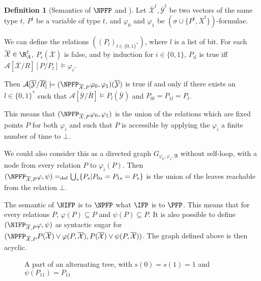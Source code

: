 \documentclass[a4paper,12pt]{article}
\theoremstyle{definition}
\newtheorem{definition}[theorem]{Definition}
\renewcommand{\phi}{\varphi}
\newcommand{\mc}{\mathcal}
\newcommand{\mf}{\mathfrak}
\newcommand{\ol}{\overline}
\newcommand{\olmc}[1]{\overline{\mathcal{#1}}}
\newcommand{\ed}{=_{\mathrm{def}}}
\begin{document}
\begin{definition}[Semantics of $\NPFP$ and \NIFP]\label{dnpfp}
  Let $\olmc {X}^{t},\olmc{Y}^{t}$ be two vectors of the same type $t$,
  $P^{t}$ be a variable of type $t$, and $\phi_{0}$  and $\phi_{1}$ be
  $(\sigma\cup\{P^{t},\ol X^{t}\})$-formulae.

  We can define the relations $((P_{l})_{l\in\{0,1\}^{*}})$, where $l$ is
  a list of bit. For each $\olmc X\in\R^{t}_{A}$, $P_{\epsilon}(\olmc
  X)$ is false, and by induction for $i\in \{0,1\}$, $P_{il}$ is true
  iff $\mc A[\olmc X/R][P/P_{t}]\models\phi_{i}$.
  

  Then $\mc A[\olmc Y/\ol R]\models(\NPFP_{\olmc X,P}\phi_{0},\phi_{1})(\olmc
  Y)$ is true if and only if there exists an $l\in\{0,1\}^{*}$ such that $\mc
  A[\olmc Y/\ol R]\models P_{l}(\olmc Y)$ and $P_{0l}=P_{{1l}}=P_{l}$.

  This means that $(\NPFP_{\olmc X,P}\phi_{0},\phi_{1})$ is the union of the
  relations which are fixed points $P$ for both $\phi_{ i}$ and
  such that $P$ is accessible by applying the $\phi_{i}$ a finite
  number of time to $\bot$.

  We could also consider this as a directed graph $G_{\phi_{0},\phi_{1},\mf
    A}$ without self-loop, with a node from every relation $P$ to
  $\phi_{i}(P)$. Then $(\NPFP_{\olmc
    X,P}\phi,\psi)\ed\bigcup_{s}\{P_{s}|P_{0s}=P_{1s}=P_{s}\}$ is
  the union of the leaves reachable from the relation $\bot$. 

  The semantic of $\NIFP$ is to $\NPFP$ what $\IFP$ is to $\PFP$. This
  means that for every relations $P$, $\phi(P)\subseteq P$ and
  $\psi(P)\subseteq P$. It is also possible to define $(\NIFP_{\olmc
    X,P}\phi,\psi)$ as syntactic sugar for $(\NPFP_{\olmc X,P}P(\olmc
  X)\lor\phi(P,\olmc X),P(\olmc X)\lor\psi(P,\olmc X))$. The graph
  defined above is then acyclic.
\end{definition}
\begin{figure}
\caption{A part of an alternating tree, with
  $s(0)=s(1)=1$ and $\psi(P_{11})=P_{11}$}
\end{figure}
\end{document}
